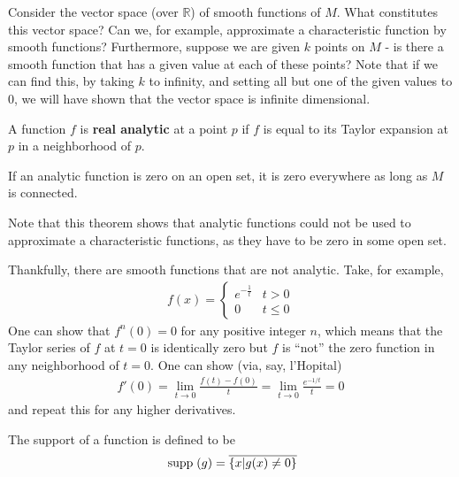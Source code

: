 \documentclass{mathnotes}
\begin{document}
Consider the vector space (over $\mathbb{R}$) of smooth functions of $M$. What constitutes this vector space? Can we, for example, approximate a characteristic
function by smooth functions? Furthermore, suppose we are given $k$ points on $M$ - is there a smooth function that has a given value at each of these points?
Note that if we can find this, by taking $k$ to infinity, and setting all but one of the given values to 0, we will have shown that the vector space is infinite
dimensional.

\begin{defn}
    A function $f$ is \textbf{real analytic} at a point $p$ if $f$ is equal to its Taylor expansion at $p$ in a neighborhood of $p$.
\end{defn}

\begin{thm}
    If an analytic function is zero on an open set, it is zero everywhere as long as $M$ is connected.
\end{thm}
Note that this theorem shows that analytic functions could not be used to approximate a characteristic functions, as they have to be zero in some open set.

Thankfully, there are smooth functions that are not analytic. Take, for example,
\begin{align*}
    f(x)=\left\{
        \begin{array}{lr}
            e^{-\frac{1}{t}} & t>0\\
            0 & t\leq 0
        \end{array}
    \right.
\end{align*}
One can show that $f^{n}(0)=0$ for any positive integer $n$, which means that the Taylor series of $f$ at $t=0$ is identically zero but $f$ is ``not''
the zero function in any neighborhood of $t=0$. One can show (via, say, l'Hopital)
\begin{align*}
    f'(0)=\lim_{t\to 0}\frac{f(t)-f(0)}{t}=\lim_{t\to 0}\frac{e^{-1/t}}{t}=0
\end{align*}
and repeat this for any higher derivatives.

\begin{lem}
\end{lem}

\begin{defn}
    The support of a function is defined to be
    \[\;\textnormal{supp}\;(g)=\overline{\left\{ x | g(x) \neq0 \right\}}\]
\end{defn}
\end{document}
